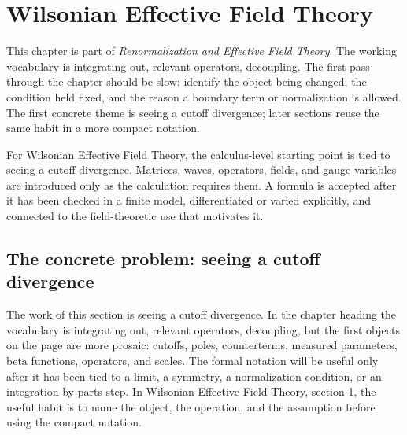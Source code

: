 \chapter{Wilsonian Effective Field Theory}


This chapter is part of \emph{Renormalization and Effective Field Theory}.  The working vocabulary is integrating out, relevant operators, decoupling.  The first pass through the chapter should be slow: identify the object being changed, the condition held fixed, and the reason a boundary term or normalization is allowed.  The first concrete theme is seeing a cutoff divergence; later sections reuse the same habit in a more compact notation.

For Wilsonian Effective Field Theory, the calculus-level starting point is tied to seeing a cutoff divergence.  Matrices, waves, operators, fields, and gauge variables are introduced only as the calculation requires them.  A formula is accepted after it has been checked in a finite model, differentiated or varied explicitly, and connected to the field-theoretic use that motivates it.

\section{The concrete problem: seeing a cutoff divergence}













The work of this section is seeing a cutoff divergence.  In the chapter heading the vocabulary is integrating out, relevant operators, decoupling, but the first objects on the page are more prosaic: cutoffs, poles, counterterms, measured parameters, beta functions, operators, and scales.  The formal notation will be useful only after it has been tied to a limit, a symmetry, a normalization condition, or an integration-by-parts step.  In Wilsonian Effective Field Theory, section 1, the useful habit is to name the object, the operation, and the assumption before using the compact notation.

